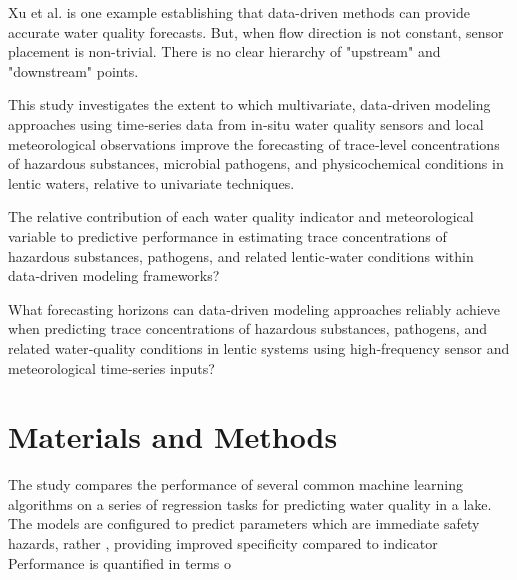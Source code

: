 \documentclass[resources,article,submit,pdftex,moreauthors]{Definitions/mdpi}
\begin{document}
Xu et al. \citep{Xu2024} is one example establishing that data-driven methods can provide accurate water quality forecasts. But, when flow direction is not constant, sensor placement is non-trivial. There is no clear hierarchy of "upstream" and "downstream" points. 


This study investigates the extent to which multivariate, data‑driven modeling approaches using time‑series data from in‑situ water quality sensors and local meteorological observations improve the forecasting of trace‑level concentrations of hazardous substances, microbial pathogens, and physicochemical conditions in lentic waters, relative to univariate techniques.

The relative contribution of each water quality indicator and meteorological variable to predictive performance in estimating trace concentrations of hazardous substances, pathogens, and related lentic‑water conditions within data‑driven modeling frameworks?

What forecasting horizons can data‑driven modeling approaches reliably achieve when predicting trace concentrations of hazardous substances, pathogens, and related water‑quality conditions in lentic systems using high‑frequency sensor and meteorological time‑series inputs?



\section{Materials and Methods}
\label{ch:MaterialsMethods}


The study compares the performance of several common machine learning algorithms on a series of regression tasks for predicting water quality in a lake. The models are configured to predict parameters which are immediate safety hazards, rather , providing improved specificity compared to indicator  Performance is quantified in terms o
\end{document}
